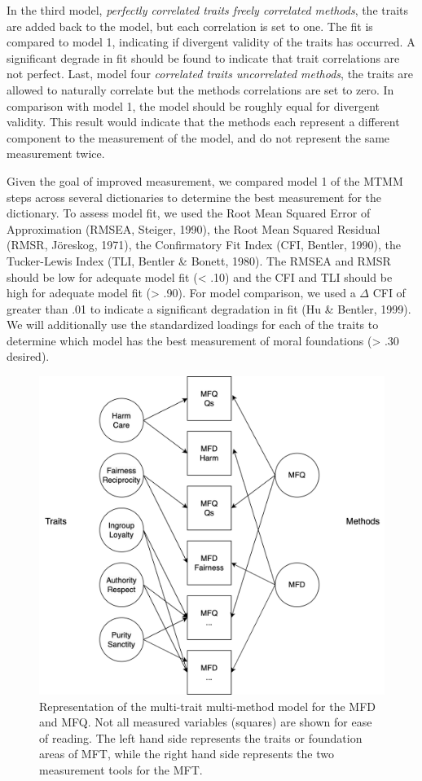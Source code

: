 \documentclass[
  man,floatsintext]{apa6}
\begin{document}
In the third model, \emph{perfectly correlated traits freely correlated methods}, the traits are added back to the model, but each correlation
is set to one. The fit is compared to model 1, indicating if divergent
validity of the traits has occurred. A significant degrade in fit should
be found to indicate that trait correlations are not perfect. Last,
model four \emph{correlated traits uncorrelated methods}, the traits are
allowed to naturally correlate but the methods correlations are set to
zero. In comparison with model 1, the model should be roughly equal for
divergent validity. This result would indicate that the methods each
represent a different component to the measurement of the model, and do
not represent the same measurement twice.

Given the goal of improved measurement, we compared model 1 of the MTMM
steps across several dictionaries to determine the best measurement for
the dictionary. To assess model fit, we used the Root Mean Squared Error
of Approximation (RMSEA, Steiger, 1990), the Root Mean Squared Residual
(RMSR, Jöreskog, 1971), the Confirmatory Fit Index (CFI, Bentler, 1990),
the Tucker-Lewis Index (TLI, Bentler \& Bonett, 1980). The RMSEA and RMSR should be
low for adequate model fit (\textless{} .10) and the CFI and TLI should be high
for adequate model fit (\textgreater{} .90). For model comparison, we used a
\(\Delta\) CFI of greater than .01 to indicate a significant degradation
in fit (Hu \& Bentler, 1999). We will additionally use the standardized loadings for
each of the traits to determine which model has the best measurement of
moral foundations (\textgreater{} .30 desired).

\begin{figure}
\includegraphics[width=6.3in]{mtmm_mfd} \caption{Representation of the multi-trait multi-method model for the MFD and MFQ. Not all measured variables (squares) are shown for ease of reading. The left hand side represents the traits or foundation areas of MFT, while the right hand side represents the two measurement tools for the MFT. }\label{fig:fig-mtmm}
\end{figure}
\end{document}
